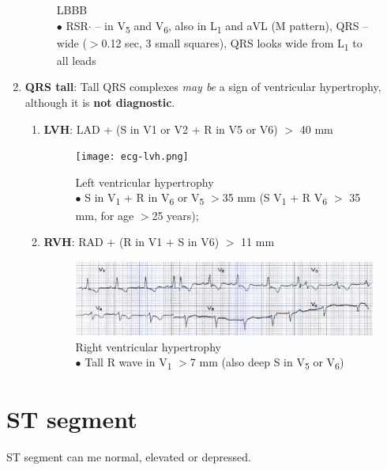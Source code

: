 \documentclass[11pt,a4paper]{report}
\begin{document}
\begin{enumerate}
\begin{figure}[htp]
		\centering \caption[LBBB]{LBBB \\ $\bullet$ RSR$\cdot$ -- in V\textsubscript{5} and V\textsubscript{6}, also in L\textsubscript{1} and aVL (M pattern), QRS -- wide ($>$0.12 sec, 3 small squares), QRS looks wide from L\textsubscript{1} to all leads  \cite{abdullah-ecg}}
		\label{ecg-lbbb}
	\end{figure}
	\newpage
	\item \textbf{QRS tall}: Tall QRS complexes \textit{may be} a sign of ventricular hypertrophy, although it is \textbf{not diagnostic}.
	\begin{enumerate}
		\item \textbf{LVH}: LAD + (S in V1 or V2 + R in V5 or V6) $>$ 40 mm
		\begin{figure}[htp]
			\centering \texttt{[image: ecg-lvh.png]}
			\centering \caption[Left ventricular hypertrophy]{Left ventricular hypertrophy \\$\bullet$ S in V\textsubscript{1} + R in V\textsubscript{6} or V\textsubscript{5} $>$35 mm (S V\textsubscript{1} + R V\textsubscript{6} $>$ 35 mm, for age $>$25 years);  \cite{abdullah-ecg}}
			\label{ecg-lvh}
		\end{figure}
		\item \textbf{RVH}: RAD + (R in V1 + S in V6) $>$ 11 mm
		\begin{figure}[htp]
			\centering \includegraphics[scale=.86]{ecg-rvh.png}
			\centering \caption[Right ventricular hypertrophy]{Right ventricular hypertrophy \\$\bullet$ Tall R wave in V\textsubscript{1} $>$7 mm (also deep S in V\textsubscript{5} or V\textsubscript{6}) \cite{abdullah-ecg}}
			\label{ecg-rvh}
		\end{figure}
	\end{enumerate}
\end{enumerate}

\newpage
\section{ST segment}
ST segment can me normal, elevated or depressed. 
\end{document}
